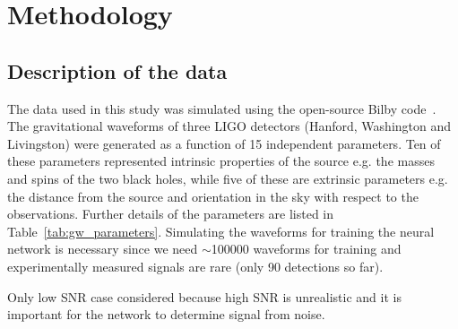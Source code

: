 \section{Methodology}
\label{sec:methodology}


\subsection{Description of the data}

The data used in this study was simulated using the open-source Bilby code~\cite{Ashton_Bilby_2019}. The gravitational waveforms of three LIGO detectors (Hanford, Washington and Livingston) were generated as a function of 15 independent parameters. Ten of these parameters represented intrinsic properties of the source e.g. the masses and spins of the two black holes, while five of these are extrinsic parameters e.g. the distance from the source and orientation in the sky with respect to the observations. Further details of the parameters are listed in Table~\ref{tab:gw_parameters}. Simulating the waveforms for training the neural network is necessary since we need $\sim$100000 waveforms for training and experimentally measured signals are rare (only 90 detections so far).

Only low SNR case considered because high SNR is unrealistic and it is important for the network to determine signal from noise.


